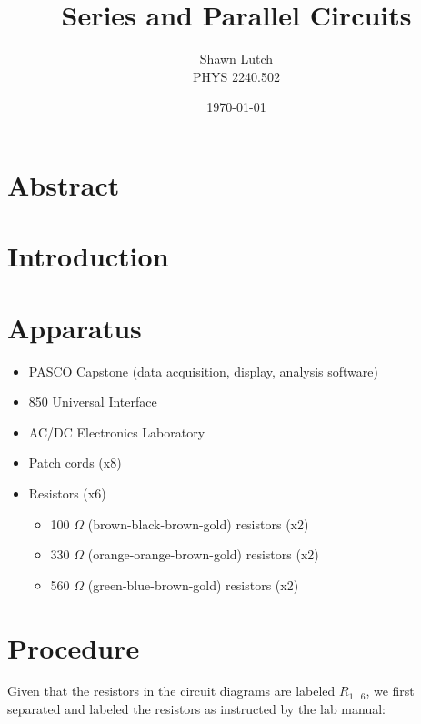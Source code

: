 \documentclass[12pt,letterpaper,titlepage]{report}
\newcommand{\myTitle}{Series and Parallel Circuits}
\newcommand{\myName}{Shawn Lutch}
\newcommand{\myPeriod}{PHYS 2240.502}
\begin{document}


\title{\myTitle{}}
\author{\myName{}\\ \myPeriod{}}
\date{\today}
\maketitle




\section*{Abstract}



\bigskip
\section*{Introduction}



\bigskip
\section*{Apparatus}

\begin{itemize}
	\item PASCO Capstone (data acquisition, display, analysis software)
	\item 850 Universal Interface
	\item AC/DC Electronics Laboratory
	\item Patch cords (x8)
	\item Resistors (x6)
		\begin{itemize}
			\item 100 $\Omega$ (brown-black-brown-gold) resistors (x2)
			\item 330 $\Omega$ (orange-orange-brown-gold) resistors (x2)
			\item 560 $\Omega$ (green-blue-brown-gold) resistors (x2)
		\end{itemize}
\end{itemize}



\bigskip
\section*{Procedure}

Given that the resistors in the circuit diagrams are labeled $R_{1\ldots6}$, we first separated and labeled the resistors as instructed by the lab manual:
\end{document}
